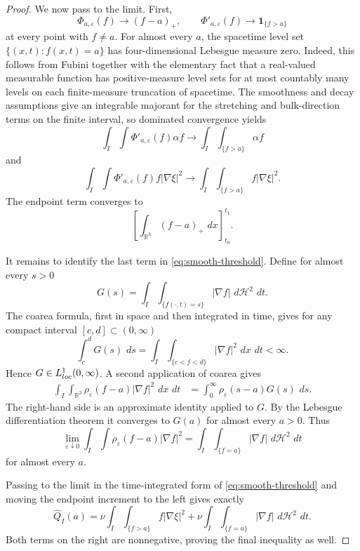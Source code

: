 \documentclass[10pt,a4paper]{amsart}
\newcommand{\Qhat}{\widehat Q}\newcommand{\Qp}{\widehat{\mathfrak Q}}
\newcommand{\R}{\mathbb R}\newcommand{\dd}{\,d}\newcommand{\HH}{\mathcal H}
\begin{document}
\begin{proof}
We now pass to the limit.  First,
\[
\Phi_{a,\varepsilon}(f)\longrightarrow(f-a)_+,
\qquad
\Phi'_{a,\varepsilon}(f)\longrightarrow\mathbf1_{\{f>a\}}
\]
at every point with $f\ne a$.  For almost every $a$, the spacetime level set
$\{(x,t):f(x,t)=a\}$ has four-dimensional Lebesgue measure zero.  Indeed,
this follows from Fubini together with the elementary fact that a real-valued
measurable function has positive-measure level sets for at most countably
many levels on each finite-measure truncation of spacetime.  The smoothness
and decay assumptions give an integrable majorant for the stretching and
bulk-direction terms on the finite interval, so dominated convergence yields
\[
\int_I\!\int\Phi'_{a,\varepsilon}(f)\alpha f
\longrightarrow
\int_I\!\int_{\{f>a\}}\alpha f
\]
and
\[
\int_I\!\int\Phi'_{a,\varepsilon}(f)f|\nabla\xi|^2
\longrightarrow
\int_I\!\int_{\{f>a\}}f|\nabla\xi|^2.
\]
The endpoint term converges to
\[
\left[\int_{\R^3}(f-a)_+\,\dd x\right]_{t_0}^{t_1}.
\]

It remains to identify the last term in \eqref{eq:smooth-threshold}.  Define
for almost every $s>0$
\[
G(s)=\int_I\int_{\{f(\cdot,t)=s\}}|\nabla f|\,\dd\HH^2\,\dd t.
\]
The coarea formula, first in space and then integrated in time, gives for
any compact interval $[c,d]\subset(0,\infty)$
\[
\int_c^dG(s)\,\dd s
=\int_I\int_{\{c<f<d\}}|\nabla f|^2\,\dd x\,\dd t<\infty.
\]
Hence $G\in L^1_{\rm loc}(0,\infty)$.  A second application of coarea gives
\[
\begin{aligned}
\int_I\int_{\R^3}\rho_\varepsilon(f-a)|\nabla f|^2\,\dd x\,\dd t
&=\int_0^\infty\rho_\varepsilon(s-a)G(s)\,\dd s.
\end{aligned}
\]
The right-hand side is an approximate identity applied to $G$.  By the
Lebesgue differentiation theorem it converges to $G(a)$ for almost every
$a>0$.  Thus
\[
\lim_{\varepsilon\downarrow0}
\int_I\int\rho_\varepsilon(f-a)|\nabla f|^2
=
\int_I\int_{\{f=a\}}|\nabla f|\,\dd\HH^2\,\dd t
\]
for almost every $a$.

Passing to the limit in the time-integrated form of
\eqref{eq:smooth-threshold} and moving the endpoint increment to the left gives
exactly
\[
\Qhat_I(a)=
\nu\int_I\int_{\{f>a\}}f|\nabla\xi|^2
+\nu\int_I\int_{\{f=a\}}|\nabla f|\,\dd\HH^2\,\dd t.
\]
Both terms on the right are nonnegative, proving the final inequality as
well.
\end{proof}
\end{document}
